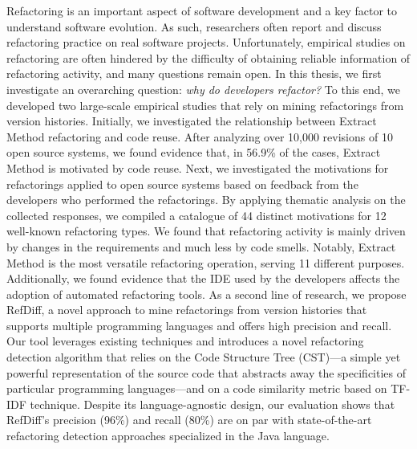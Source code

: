 



Refactoring is an important aspect of software development and a key factor to understand software evolution.
As such, researchers often report and discuss refactoring practice on real software projects.
Unfortunately, empirical studies on refactoring are often hindered by the difficulty of obtaining reliable information of refactoring activity, and many questions remain open.
In this thesis, we first investigate an overarching question: \emph{why do developers refactor?}
To this end, we developed two large-scale empirical studies that rely on mining refactorings from version histories. 
Initially, we investigated the relationship between Extract Method refactoring and code reuse. After analyzing over 10,000 revisions of 10 open source systems, we found evidence that, in 56.9\% of the cases, Extract Method is motivated by code reuse.
Next, we investigated the motivations for refactorings applied to open source systems based on feedback from the developers who performed the refactorings. 
By applying thematic analysis on the collected responses, we compiled a catalogue of 44 distinct motivations for 12 well-known refactoring types.
We found that refactoring activity is mainly driven by changes in the requirements and much less by code smells. Notably, Extract Method is the most versatile refactoring operation, serving 11 different purposes.
Additionally, we found evidence that the IDE used by the developers affects the adoption of automated refactoring tools.
As a second line of research, we propose RefDiff, a novel approach to mine refactorings from version histories that supports multiple programming languages and offers high precision and recall.
Our tool leverages existing techniques and introduces a novel refactoring detection algorithm that relies on the Code Structure Tree (CST)---a simple yet powerful representation of the source code that abstracts away the specificities of particular programming languages---and on a code similarity metric based on TF-IDF technique.
Despite its language-agnostic design, our evaluation shows that RefDiff's precision (96\%) and recall (80\%) are on par with state-of-the-art refactoring detection approaches specialized in the Java language.

